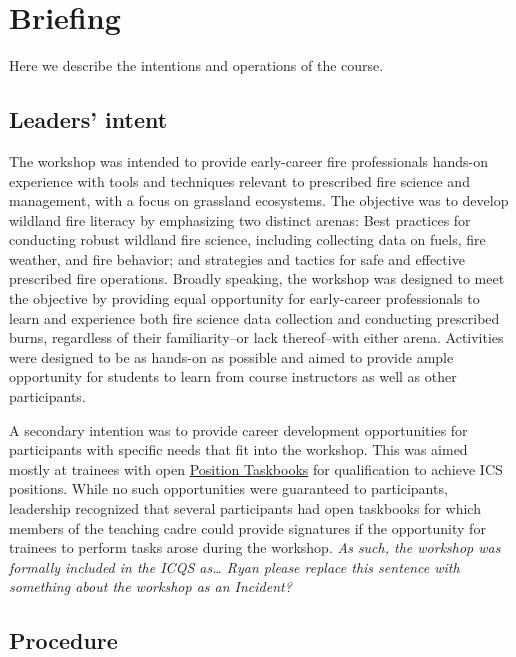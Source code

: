 \documentclass[fire,article,submit,moreauthors,pdftex]{Definitions/mdpi}
\begin{document}
\hypertarget{briefing}{%
\section{Briefing}\label{briefing}}

Here we describe the intentions and operations of the course.

\hypertarget{leaders-intent}{%
\subsection{Leaders' intent}\label{leaders-intent}}

The workshop was intended to provide early-career fire professionals hands-on experience with tools and techniques relevant to prescribed fire science and management, with a focus on grassland ecosystems.
The objective was to develop wildland fire literacy by emphasizing two distinct arenas: Best practices for conducting robust wildland fire science, including collecting data on fuels, fire weather, and fire behavior; and strategies and tactics for safe and effective prescribed fire operations.
Broadly speaking, the workshop was designed to meet the objective by providing equal opportunity for early-career professionals to learn and experience both fire science data collection and conducting prescribed burns, regardless of their familiarity--or lack thereof--with either arena.
Activities were designed to be as hands-on as possible and aimed to provide ample opportunity for students to learn from course instructors as well as other participants.

A secondary intention was to provide career development opportunities for participants with specific needs that fit into the workshop.
This was aimed mostly at trainees with open \href{https://www.nwcg.gov/publications/position-taskbooks/about}{Position Taskbooks} for qualification to achieve ICS positions.
While no such opportunities were guaranteed to participants, leadership recognized that several participants had open taskbooks for which members of the teaching cadre could provide signatures if the opportunity for trainees to perform tasks arose during the workshop.
\emph{As such, the workshop was formally included in the ICQS as\ldots{} Ryan please replace this sentence with something about the workshop as an Incident?}

\hypertarget{procedure}{%
\subsection{Procedure}\label{procedure}}
\end{document}
